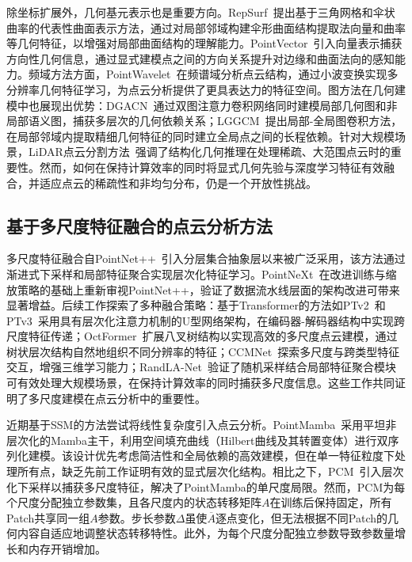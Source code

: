 \documentclass[12pt,a4paper,openany,oneside]{ctexbook}
\theoremstyle{definition}
\theoremstyle{remark}
\begin{document}
除坐标扩展外，几何基元表示也是重要方向。RepSurf~\cite{repsurf}提出基于三角网格和伞状曲率的代表性曲面表示方法，通过对局部邻域构建伞形曲面结构提取法向量和曲率等几何特征，以增强对局部曲面结构的理解能力。PointVector~\cite{pointvector}引入向量表示捕获方向性几何信息，通过显式建模点之间的方向关系提升对边缘和曲面法向的感知能力。频域方法方面，PointWavelet~\cite{pointwavelet}在频谱域分析点云结构，通过小波变换实现多分辨率几何特征学习，为点云分析提供了更具表达力的特征空间。图方法在几何建模中也展现出优势：DGACN~\cite{dgacn}通过双图注意力卷积网络同时建模局部几何图和非局部语义图，捕获多层次的几何依赖关系；LGGCM~\cite{lggcm}提出局部-全局图卷积方法，在局部邻域内提取精细几何特征的同时建立全局点之间的长程依赖。针对大规模场景，LiDAR点云分割方法~\cite{lidar_segmentation}强调了结构化几何推理在处理稀疏、大范围点云时的重要性。然而，如何在保持计算效率的同时将显式几何先验与深度学习特征有效融合，并适应点云的稀疏性和非均匀分布，仍是一个开放性挑战。

\subsection{基于多尺度特征融合的点云分析方法}
多尺度特征融合自PointNet++~\cite{PointNetpp}引入分层集合抽象层以来被广泛采用，该方法通过渐进式下采样和局部特征聚合实现层次化特征学习。PointNeXt~\cite{pointnext}在改进训练与缩放策略的基础上重新审视PointNet++，验证了数据流水线层面的架构改进可带来显著增益。后续工作探索了多种融合策略：基于Transformer的方法如PTv2~\cite{ptv2}和PTv3~\cite{ptv3}采用具有层次化注意力机制的U型网络架构，在编码器-解码器结构中实现跨尺度特征传递；OctFormer~\cite{octformer2}扩展八叉树结构以实现高效的多尺度点云建模，通过树状层次结构自然地组织不同分辨率的特征；CCMNet~\cite{ccmnet}探索多尺度与跨类型特征交互，增强三维学习能力；RandLA-Net~\cite{Randla}验证了随机采样结合局部特征聚合模块可有效处理大规模场景，在保持计算效率的同时捕获多尺度信息。这些工作共同证明了多尺度建模在点云分析中的重要性。

近期基于SSM的方法尝试将线性复杂度引入点云分析。PointMamba~\cite{PointMamba}采用平坦非层次化的Mamba主干，利用空间填充曲线（Hilbert曲线及其转置变体）进行双序列化建模。该设计优先考虑简洁性和全局依赖的高效建模，但在单一特征粒度下处理所有点，缺乏先前工作证明有效的显式层次化结构。相比之下，PCM~\cite{pcm}引入层次化下采样以捕获多尺度特征，解决了PointMamba的单尺度局限。然而，PCM为每个尺度分配独立参数集，且各尺度内的状态转移矩阵$A$在训练后保持固定，所有Patch共享同一组$A$参数。步长参数$\Delta$虽使$\overline{A}$逐点变化，但无法根据不同Patch的几何内容自适应地调整状态转移特性。此外，为每个尺度分配独立参数导致参数量增长和内存开销增加。
\end{document}
